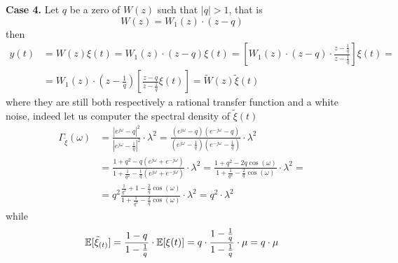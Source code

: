 \textbf{Case 4.}
Let $q$ be a zero of $W(z)$ such that $|q|>1$, that is
\[
	W(z)=W_{1}(z)⋅(z-q)
\]
then
\begin{align*}
	y(t)&=W(z) \xi(t)=W_{1}(z) \cdot(z-q) \xi(t)=\left[W_{1}(z) \cdot(z-q) \cdot \frac{z-\frac{1}{q}}{z-\frac{1}{q}}\right] \xi(t)= \\
	&=W_{1}(z) \cdot\left(z-\frac{1}{q}\right)\left[\frac{z-q}{z-\frac{1}{q}} \xi(t)\right]=\tilde{W}(z) \tilde{\xi}(t)
\end{align*}
where they are still both respectively a rational transfer function and a white noise, indeed let us computer the spectral density of $\tilde{\xi}(t)$
\begin{align*}
	\Gamma_{\tilde\xi}(\omega) &=\frac{\left|e^{j \omega}-q\right|^{2}}{\left|e^{j \omega}-\frac{1}{q}\right|^{2}} \cdot \lambda^{2}=\frac{\left(e^{j \omega}-q\right)\left(e^{-j \omega}-q\right)}{\left(e^{j \omega}-\frac{1}{q}\right)\left(e^{-j \omega}-\frac{1}{q}\right)} \cdot \lambda^{2}\\
	&=\frac{1+q^{2}-q\left(e^{j \omega}+e^{-j \omega}\right)}{1+\frac{1}{q^{2}}-\frac{1}{q}\left(e^{j \omega}+e^{-j \omega}\right)} \cdot \lambda^{2}=\frac{1+q^{2}-2 q \cos (\omega)}{1+\frac{1}{q^{2}}-\frac{2}{q} \cos (\omega)} \cdot \lambda^{2}=\\
	&=q^{2} \frac{\frac{1}{q^{2}}+1-\frac{2}{q} \cos (\omega)}{1+\frac{1}{q^{2}}-\frac{2}{q} \cos (\omega)} \cdot \lambda^{2}=q^{2} \cdot \lambda^{2}
\end{align*}
while
\[
	\mathbb{E}[\tilde{\xi}_{(t)}]=\frac{1-q}{1-\frac{1}{q}} \cdot \mathbb{E}[\xi(t)]=q \cdot \frac{1-\frac{1}{q}}{1-\frac{1}{q}} \cdot \mu=q \cdot \mu
\]










































